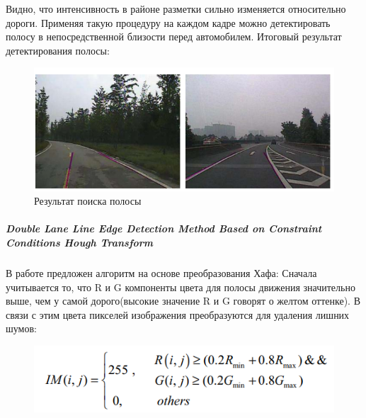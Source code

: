 Видно, что интенсивность в районе разметки сильно изменяется относительно дороги. Применяя такую процедуру на каждом кадре можно детектировать полосу в непосредственной близости перед автомобилем. Итоговый результат детектирования полосы:
\begin{figure}[!h]
	\centering
	\includegraphics[width=1\linewidth]{pictures/screenshot00234}
	\caption{Результат поиска полосы}
	\label{fig:screenshot00234}
\end{figure}

\subparagraph{Double Lane Line Edge Detection Method Based on Constraint Conditions Hough Transform}
В работе \cite{b:lane_detection_hough} предложен алгоритм на основе преобразования Хафа\cite{b:hough_transform}:
Сначала учитывается то, что R и G компоненты цвета для полосы движения значительно выше, чем у самой дорого(высокие значение R и G говорят о желтом оттенке). В связи с этим цвета пикселей изображения преобразуются для удаления лишних шумов:
\begin{figure}[!h]
	\centering
	\includegraphics[width=0.7\linewidth]{pictures/screenshot025}
	\caption{}
	\label{fig:screenshot025}
\end{figure}


